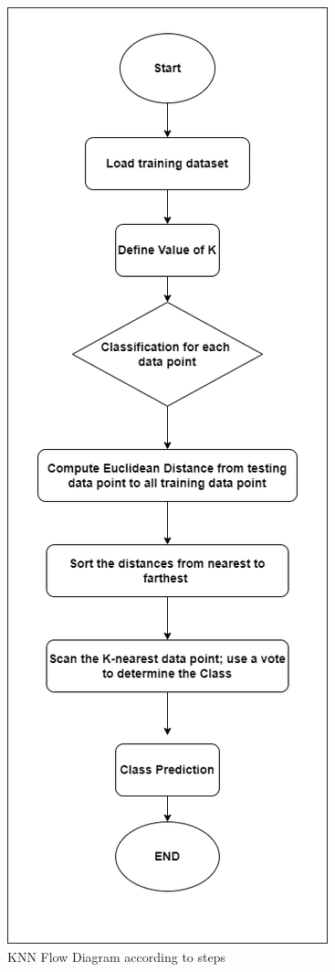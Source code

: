 \documentclass[conference]{IEEEtran}
\begin{document}
\begin{figure}
    \centering
    \includegraphics[width=0.5\linewidth]{KNNClassifier.png}
    \caption{KNN Flow Diagram according to steps}
    \label{fig:enter-label}
\end{figure}
\end{document}
